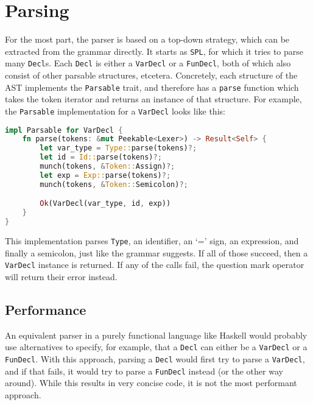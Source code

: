 \section{Parsing}
For the most part, the parser is based on a top-down strategy, which can be extracted from the grammar directly. It starts as \lstinline[language=rust]|SPL|, for which it tries to parse many \lstinline[language=rust]|Decl|s. Each \lstinline[language=rust]|Decl| is either a \lstinline[language=rust]|VarDecl| or a \lstinline[language=rust]|FunDecl|, both of which also consist of other parsable structures, etcetera. Concretely, each structure of the AST implements the \lstinline[language=rust]|Parsable| trait, and therefore has a \lstinline[language=rust]|parse| function which takes the token iterator and returns an instance of that structure. For example, the \lstinline[language=rust]|Parsable| implementation for a \lstinline[language=rust]|VarDecl| looks like this:

\begin{lstlisting}[language=rust]
impl Parsable for VarDecl {
    fn parse(tokens: &mut Peekable<Lexer>) -> Result<Self> {
        let var_type = Type::parse(tokens)?;
        let id = Id::parse(tokens)?;
        munch(tokens, &Token::Assign)?;
        let exp = Exp::parse(tokens)?;
        munch(tokens, &Token::Semicolon)?;

        Ok(VarDecl(var_type, id, exp))
    }
}
\end{lstlisting}

This implementation parses \lstinline[language=rust]|Type|, an identifier, an `=' sign, an expression, and finally a semicolon, just like the grammar suggests. If all of those succeed, then a \lstinline[language=rust]|VarDecl| instance is returned. If any of the calls fail, the question mark operator will return their error instead.

\subsection{Performance}
An equivalent parser in a purely functional language like Haskell would probably use alternatives to specify, for example, that a \lstinline[language=rust]|Decl| can either be a \lstinline[language=rust]|VarDecl| or a \lstinline[language=rust]|FunDecl|. With this approach, parsing a \lstinline[language=rust]|Decl| would first try to parse a \lstinline[language=rust]|VarDecl|, and if that fails, it would try to parse a \lstinline[language=rust]|FunDecl| instead (or the other way around). While this results in very concise code, it is not the most performant approach.

